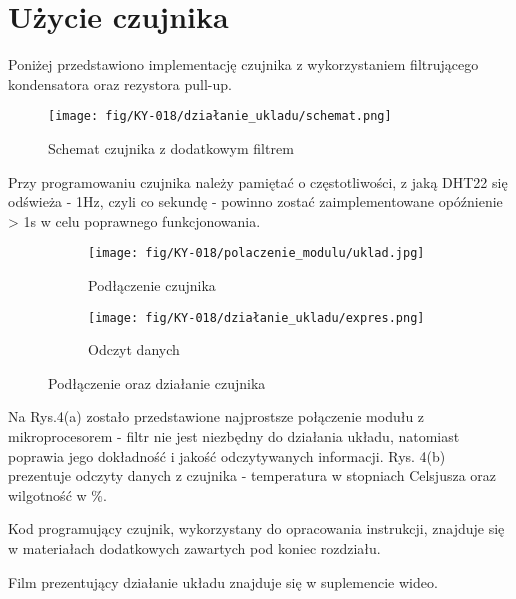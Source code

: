 \documentclass[11pt, a4paper]{article}
\begin{document}
\newpage
\section*{Użycie czujnika}

Poniżej przedstawiono implementację czujnika z wykorzystaniem filtrującego kondensatora oraz rezystora pull-up.

\vspace{0.5cm}
\begin{figure}[h!]
    \centering
    \texttt{[image: fig/KY-018/działanie\_ukladu/schemat.png]}
    \caption{Schemat czujnika z dodatkowym filtrem}
    \label{fig:my_label}
\end{figure}

Przy programowaniu czujnika należy pamiętać o częstotliwości, z jaką DHT22 się odświeża - 1Hz, czyli co sekundę - powinno zostać zaimplementowane opóźnienie > 1s w celu poprawnego funkcjonowania.

\begin{figure}[h!]
\centering
\begin{subfigure}{.5\textwidth}
  \centering
  \texttt{[image: fig/KY-018/polaczenie\_modulu/uklad.jpg]}
  \caption{Podłączenie czujnika}
  \label{fig:sub1}
\end{subfigure}%
\begin{subfigure}{.5\textwidth}
  \centering
  \texttt{[image: fig/KY-018/działanie\_ukladu/expres.png]}
  \caption{Odczyt danych}
\end{subfigure}
\caption{Podłączenie oraz działanie czujnika}
\label{fig:test}
\end{figure}
Na Rys.4(a) zostało przedstawione najprostsze połączenie modułu z mikroprocesorem - filtr nie jest niezbędny do działania układu, natomiast poprawia jego dokładność i jakość odczytywanych informacji. Rys. 4(b) prezentuje odczyty danych z czujnika - temperatura w stopniach Celsjusza oraz wilgotność w \%.
\newline

Kod programujący czujnik, wykorzystany do opracowania instrukcji, znajduje się w materiałach dodatkowych zawartych pod koniec rozdziału.

Film prezentujący działanie układu znajduje się w suplemencie wideo.

\newpage

\printbibliography[heading=bibintoc]
\end{document}
